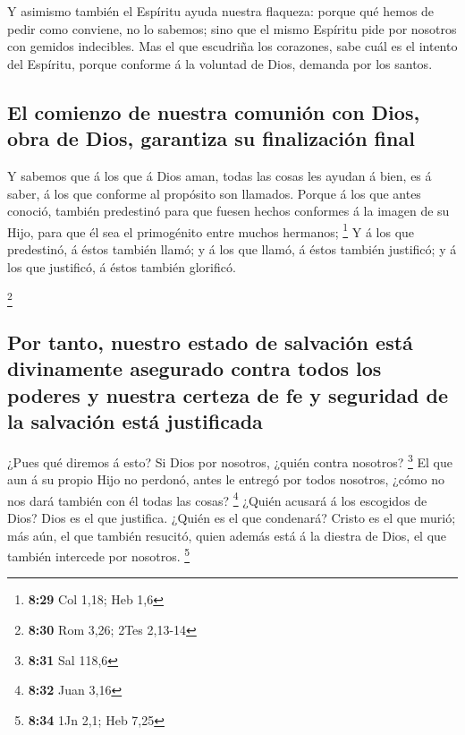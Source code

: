  Y asimismo también el Espíritu ayuda nuestra flaqueza:
porque qué hemos de pedir como conviene, no lo sabemos; sino que el
mismo Espíritu pide por nosotros con gemidos indecibles. 
Mas el que escudriña los corazones, sabe cuál es el intento del
Espíritu, porque conforme á la voluntad de Dios, demanda por los santos.

\hypertarget{el-comienzo-de-nuestra-comuniuxf3n-con-dios-obra-de-dios-garantiza-su-finalizaciuxf3n-final}{%
\subsection{El comienzo de nuestra comunión con Dios, obra de Dios,
garantiza su finalización
final}\label{el-comienzo-de-nuestra-comuniuxf3n-con-dios-obra-de-dios-garantiza-su-finalizaciuxf3n-final}}

 Y sabemos que á los que á Dios aman, todas las cosas les
ayudan á bien, es á saber, á los que conforme al propósito son llamados.
 Porque á los que antes conoció, también predestinó para
que fuesen hechos conformes á la imagen de su Hijo, para que él sea el
primogénito entre muchos hermanos; \footnote{\textbf{8:29} Col 1,18; Heb
  1,6}  Y á los que predestinó, á éstos también llamó; y á
los que llamó, á éstos también justificó; y á los que justificó, á éstos
también glorificó.

\footnote{\textbf{8:30} Rom 3,26; 2Tes 2,13-14}

\hypertarget{por-tanto-nuestro-estado-de-salvaciuxf3n-estuxe1-divinamente-asegurado-contra-todos-los-poderes-y-nuestra-certeza-de-fe-y-seguridad-de-la-salvaciuxf3n-estuxe1-justificada}{%
\subsection{Por tanto, nuestro estado de salvación está divinamente
asegurado contra todos los poderes y nuestra certeza de fe y seguridad
de la salvación está
justificada}\label{por-tanto-nuestro-estado-de-salvaciuxf3n-estuxe1-divinamente-asegurado-contra-todos-los-poderes-y-nuestra-certeza-de-fe-y-seguridad-de-la-salvaciuxf3n-estuxe1-justificada}}

 ¿Pues qué diremos á esto? Si Dios por nosotros, ¿quién
contra nosotros? \footnote{\textbf{8:31} Sal 118,6}  El que
aun á su propio Hijo no perdonó, antes le entregó por todos nosotros,
¿cómo no nos dará también con él todas las cosas? \footnote{\textbf{8:32}
  Juan 3,16}  ¿Quién acusará á los escogidos de Dios? Dios
es el que justifica.  ¿Quién es el que condenará? Cristo es
el que murió; más aún, el que también resucitó, quien además está á la
diestra de Dios, el que también intercede por nosotros. \footnote{\textbf{8:34}
  1Jn 2,1; Heb 7,25}

